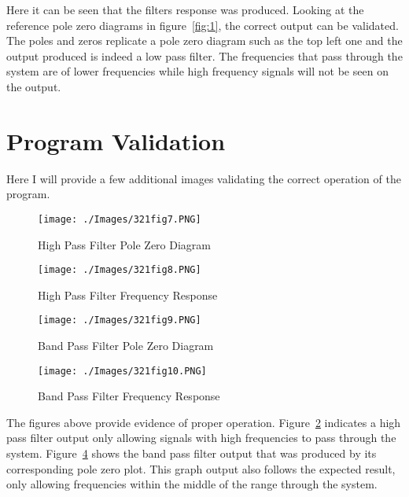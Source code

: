 \documentclass[a4paper]{article}
\begin{document}
\clearpage
Here it can be seen that the filters response was produced. Looking at the reference pole zero diagrams in figure~\ref{fig:1}, the correct output can be validated. The poles and zeros replicate a pole zero diagram such as the top left one and the output produced is indeed a low pass filter. The frequencies that pass through the system are of lower frequencies while high frequency signals will not be seen on the output.

\section{Program Validation}
Here I will provide a few additional images validating the correct operation of the program.

  \begin{figure}[h]
    \centering
    \texttt{[image: ./Images/321fig7.PNG]}
    \caption{High Pass Filter Pole Zero Diagram}
    \label{fig:7}
  \end{figure}

  \begin{figure}[h]
    \centering
    \texttt{[image: ./Images/321fig8.PNG]}
    \caption{High Pass Filter Frequency Response}
    \label{fig:8}
  \end{figure}
 
 \clearpage
  
   \begin{figure}[h]
    \centering
    \texttt{[image: ./Images/321fig9.PNG]}
    \caption{Band Pass Filter Pole Zero Diagram}
    \label{fig:9}
  \end{figure}

  \begin{figure}[h]
    \centering
    \texttt{[image: ./Images/321fig10.PNG]}
    \caption{Band Pass Filter Frequency Response}
    \label{fig:10}
  \end{figure}
  \clearpage
  
The figures above provide evidence of proper operation. Figure~\ref{fig:8} indicates a high pass filter output only allowing signals with high frequencies to pass through the system. Figure~\ref{fig:10} shows the band pass filter output that was produced by its corresponding pole zero plot. This graph output also follows the expected result, only allowing frequencies within the middle of the range through the system.    
  
\end{document}
